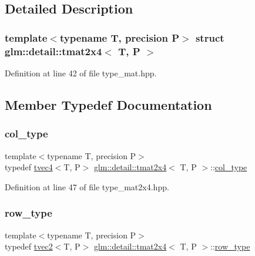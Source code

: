 \subsection{Detailed Description}
\subsubsection*{template$<$typename T, precision P$>$\newline
struct glm\+::detail\+::tmat2x4$<$ T, P $>$}



Definition at line 42 of file type\+\_\+mat.\+hpp.



\subsection{Member Typedef Documentation}
\mbox{\label{structglm_1_1detail_1_1tmat2x4_a7324a2efc8a0f59f538568015bdda76b}} 
\subsubsection{\texorpdfstring{col\+\_\+type}{col\_type}}
{\footnotesize\ttfamily template$<$typename T, precision P$>$ \\
typedef \hyperlink{structglm_1_1detail_1_1tvec4}{tvec4}$<$T, P$>$ \hyperlink{structglm_1_1detail_1_1tmat2x4}{glm\+::detail\+::tmat2x4}$<$ T, P $>$\+::\hyperlink{structglm_1_1detail_1_1tmat2x4_a7324a2efc8a0f59f538568015bdda76b}{col\+\_\+type}}



Definition at line 47 of file type\+\_\+mat2x4.\+hpp.

\mbox{\label{structglm_1_1detail_1_1tmat2x4_a3048033664c24f3c2bb2f326f32a0654}} 
\subsubsection{\texorpdfstring{row\+\_\+type}{row\_type}}
{\footnotesize\ttfamily template$<$typename T, precision P$>$ \\
typedef \hyperlink{structglm_1_1detail_1_1tvec2}{tvec2}$<$T, P$>$ \hyperlink{structglm_1_1detail_1_1tmat2x4}{glm\+::detail\+::tmat2x4}$<$ T, P $>$\+::\hyperlink{structglm_1_1detail_1_1tmat2x4_a3048033664c24f3c2bb2f326f32a0654}{row\+\_\+type}}



